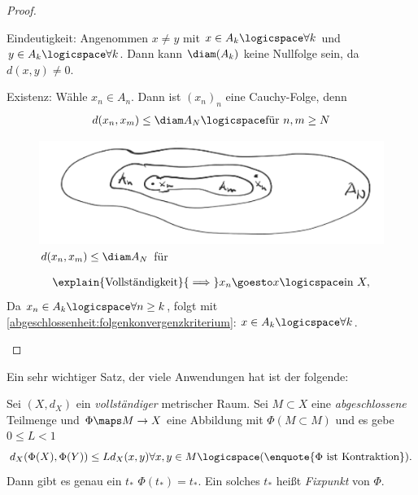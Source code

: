 \begin{proof}
    \begin{proofdescription}
        \item[Eindeutigkeit:] Angenommen \texists \( x\neq y\)  mit \( x\in A_k \logicspace \forall k\)  und \( y\in A_k \logicspace \forall k\). Dann kann \( \diam(A_k)\) keine Nullfolge sein, da \( d(x,y)\neq 0\).
        \item[Existenz:] Wähle \( x_n\in A_n\). Dann ist \( (x_n)_n\)  eine Cauchy-Folge, denn
        \begin{align*}
            d(x_n,x_m)\leq \diam A_N \logicspace \text{für }n,m\geq N 
        \end{align*} 
        \begin{figure}[H]
            \centering
            \includegraphics[width=0.5\linewidth]{figures/schachtelungsprinzip}
            \caption*{\( d(x_n,x_m)\leq \diam A_N\) für \( \)    }
            \label{fig:schachtelungsprinzip}
        \end{figure}
        \begin{align*}
            \explain{\text{Vollständigkeit}}{\implies}x_n \goesto x \logicspace \text{in } X,
        \end{align*}
        Da \( x_n\in A_k\logicspace \forall n\geq k\), folgt mit \ref{abgeschlossenheit:folgenkonvergenzkriterium}: \( x\in A_k\logicspace \forall k\). 
    \end{proofdescription}
\end{proof}
Ein sehr wichtiger Satz, der viele Anwendungen hat ist der folgende:
\begin{satz}
    Sei \( (X,d_X)\) ein \emph{vollständiger} metrischer Raum. Sei \( M\subset X\) eine \emph{abgeschlossene} Teilmenge und \( \Phi\maps M\to X\) eine Abbildung mit \( \Phi(M\subset M)\) und es gebe \( 0\leq L<1\) \sd
    \begin{align*}
        d_X(\Phi(X),\Phi(Y))\leq L d_X(x,y)\forall x,y\in M\logicspace (\text{\enquote{\( \Phi\) ist Kontraktion}}).
    \end{align*}
    Dann gibt es genau ein \( t_*\) \sd \( \Phi(t_*)=t_*\). Ein solches \( t_*\) heißt \emph{Fixpunkt} von \( \Phi\). 
\end{satz}
